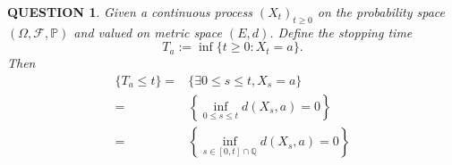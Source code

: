 \documentclass[12pt]{article}
\renewcommand{\(}{\left(}%
\renewcommand{\)}{\right)}%
\renewcommand{\[}{\left[}%
\renewcommand{\]}{\right]}%
\newcommand{\p}{\mathbb{P}}
\newcommand{\q}{\mathbb{Q}}
\newcommand{\f}{\mathscr{F}}
\newtheorem{question}{QUESTION}[section]}
\begin{document}
  \begin{question}
  	Given a continuous process $(X_t)_{t\geq 0}$ on the probability space $(\Omega,\f,\p)$ and valued on metric space $(E,d)$. Define the stopping time
  	\begin{equation*}
  		T_a:=\inf\{t\geq 0:X_t=a\}.
  	\end{equation*}
  	Then
  	\begin{equation*}
  		\begin{split}
  			\{T_a\leq t\}=&\{\exists 0\leq s\leq t, X_s=a \}\\
  			=&\left\{\inf_{0\leq s\leq t}d(X_s,a)=0\right\}\\
  			=&\left\{\inf_{s\in[0,t]\cap\q}d(X_s,a)=0\right\}
  		\end{split}
  	\end{equation*}
  \end{question}
\end{document}
